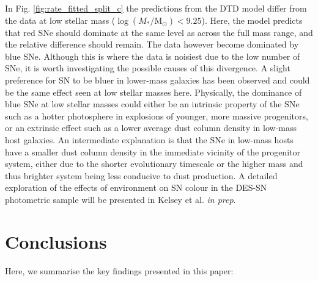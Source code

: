 \documentclass[fleqn,usenatbib]{mnras}
\begin{document}
In Fig. \ref{fig:rate_fitted_split_c} the predictions from the DTD model differ from the data at low stellar mass ($\log(M_*/\mathrm{M}_{\odot}) <9.25$). Here, the model predicts that red SNe should dominate at the same level as across the full mass range, and the relative difference should remain. The data however become dominated by blue SNe. Although this is where the data is noisiest due to the low number of SNe, it is worth investigating the possible causes of this divergence. A slight preference for SN to be bluer in lower-mass galaxies has been observed \citep{Scolnic2018,Brout2019,Smith2020,Kelsey2021} and could be the same effect seen at low stellar masses here. Physically, the dominance of blue SNe at low stellar masses could either be an intrinsic property of the SNe such as a hotter photosphere in explosions of younger, more massive progenitors, or an extrinsic effect such as a lower average dust column density in low-mass host galaxies. An intermediate explanation is that the SNe in low-mass hosts have a smaller dust column density in the immediate vicinity of the progenitor system, either due to the shorter evolutionary timescale or the higher mass and thus brighter system being less conducive to dust production. A detailed exploration of the effects of environment on SN colour in the DES-SN photometric sample will be presented in Kelsey et al. \textit{in prep}.

\section{Conclusions}
\label{sec:conclusion}

Here, we summarise the key findings presented in this paper:
\end{document}
